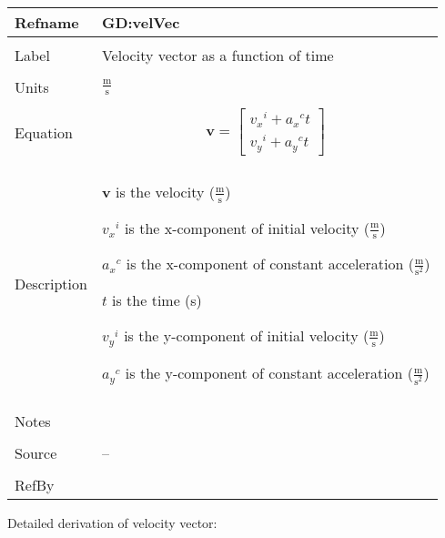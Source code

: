 \documentclass[12pt]{article}
\begin{document}
\noindent \begin{minipage}{\textwidth}
\begin{tabular}{p{} p{}}
\toprule \textbf{Refname} & \textbf{GD:velVec}
\label{GD:velVec}
\\ \midrule \\
Label & Velocity vector as a function of time
\\ \midrule \\
Units & $\frac{\text{m}}{\text{s}}$
\\ \midrule \\
Equation & \begin{displaymath}
           \mathbf{v}=\begin{bmatrix}
{{v_{x}}^{i}}+{{a_{x}}^{c}} t\\
{{v_{y}}^{i}}+{{a_{y}}^{c}} t
\end{bmatrix}
           \end{displaymath}
\\ \midrule \\
Description & \begin{symbDescription}
              \item{$\mathbf{v}$ is the velocity ($\frac{\text{m}}{\text{s}}$)}
              \item{${{v_{x}}^{i}}$ is the x-component of initial velocity ($\frac{\text{m}}{\text{s}}$)}
              \item{${{a_{x}}^{c}}$ is the x-component of constant acceleration ($\frac{\text{m}}{\text{s}^{2}}$)}
              \item{$t$ is the time (s)}
              \item{${{v_{y}}^{i}}$ is the y-component of initial velocity ($\frac{\text{m}}{\text{s}}$)}
              \item{${{a_{y}}^{c}}$ is the y-component of constant acceleration ($\frac{\text{m}}{\text{s}^{2}}$)}
              \end{symbDescription}
\\ \midrule \\
Notes & 
\\ \midrule \\
Source & --
\\ \midrule \\
RefBy & 
\\ \bottomrule \end{tabular}
\end{minipage}
Detailed derivation of velocity vector:
\end{document}
